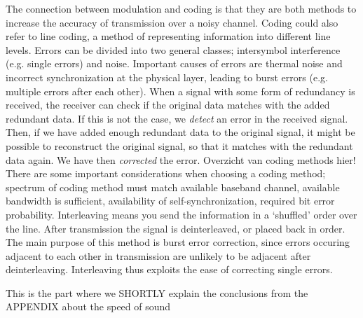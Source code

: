 \documentclass[11pt,titlepage]{report}
\begin{document}
The connection between modulation and coding is that they are both methods to increase the accuracy of transmission over a noisy channel. Coding could also refer to line coding, a method of representing information into different line levels.
Errors can be divided into two general classes; intersymbol interference (e.g. single errors) and noise. Important causes of errors are thermal noise and incorrect synchronization at the physical layer, leading to burst errors (e.g. multiple errors after each other).
When a signal with some form of redundancy is received, the receiver can check if the original data matches with the added redundant data. If this is not the case, we \emph{detect} an error in the received signal. Then, if we have added enough redundant data to the original signal, it might be possible to reconstruct the original signal, so that it matches with the redundant data again. We have then \emph{corrected} the error.
Overzicht van coding methods hier!
There are some important considerations when choosing a coding method; spectrum of coding method must match available baseband channel, available bandwidth is sufficient, availability of self-synchronization, required bit error probability.
Interleaving means you send the information in a `shuffled' order over the line. After transmission the signal is deinterleaved, or placed back in order. The main purpose of this method is burst error correction, since errors occuring adjacent to each other in transmission are unlikely to be adjacent after deinterleaving. Interleaving thus exploits the ease of correcting single errors.

This is the part where we SHORTLY explain the conclusions from the APPENDIX about the speed of sound 
\end{document}
